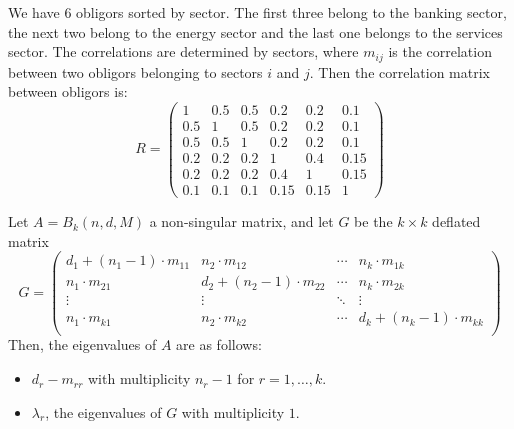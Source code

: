 \documentclass[11pt,fleqn]{book} %
\begin{document}
\begin{example}
	\label{example1}
	We have $6$ obligors sorted by sector. The first three belong to the 
	banking sector, the next two belong to the energy sector 
	and the last one belongs to the services sector. The correlations are 
	determined by sectors, where $m_{ij}$ is the correlation between two 
	obligors belonging to sectors $i$ and $j$. Then the correlation matrix 
	between obligors is:
	\begin{displaymath}
		R=
		\left(
		\begin{array}{ccc|cc|c} 
			1   & 0.5 & 0.5 & 0.2  & 0.2  & 0.1  \\ 
			0.5 & 1   & 0.5 & 0.2  & 0.2  & 0.1  \\ 
			0.5 & 0.5 & 1   & 0.2  & 0.2  & 0.1  \\ 
			\hline
			0.2 & 0.2 & 0.2 & 1    & 0.4  & 0.15 \\ 
			0.2 & 0.2 & 0.2 & 0.4  & 1    & 0.15 \\ 
			\hline
			0.1 & 0.1 & 0.1 & 0.15 & 0.15 & 1    
		\end{array} 
		\right)
	\end{displaymath}
\end{example}

\begin{proposition}
	\label{prop1}
	Let $A = B_k(n, d, M)$ a non-singular matrix, and let $G$ be the $k {\times} k$ 
	deflated matrix
	\begin{displaymath}
		G =
		\left( \begin{array}{cccc}
		d_1+(n_1-1)\cdot m_{11} & n_2 \cdot m_{12}        & \cdots & n_k \cdot m_{1k} \\
		n_1\cdot m_{21}         & d_2+(n_2-1)\cdot m_{22} & \cdots & n_k \cdot m_{2k} \\
		\vdots                  & \vdots                  & \ddots & \vdots \\
		n_1\cdot m_{k1}         & n_2 \cdot m_{k2}        & \cdots & d_k+(n_k-1)\cdot m_{kk} \\
		\end{array} \right)
	\end{displaymath}
	Then, the eigenvalues of $A$ are as follows:
	\begin{itemize}
		\item $d_{r}-m_{rr}$ with multiplicity $n_r-1$ for $r=1,\dots,k$.
		\item $\lambda_r$, the eigenvalues of $G$ with multiplicity $1$.
	\end{itemize}
\end{proposition}
\end{document}
